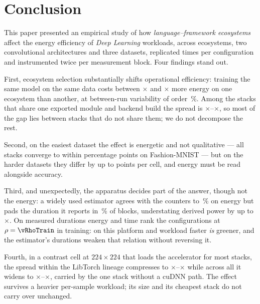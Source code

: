 \section{Conclusion}
\label{sec:conclusion}

This paper presented an empirical study of how \emph{language--framework
ecosystems} affect the energy efficiency of \emph{Deep Learning} workloads,
across \vEcosystems{} ecosystems, two convolutional architectures and three
datasets, replicated \vRepetitions{} times per configuration and instrumented
twice per measurement block. Four findings stand out.

First, ecosystem selection substantially shifts operational efficiency:
training the same model on the same data costs between \vSpreadTrainMin$\times$
and \vSpreadTrainMax$\times$ more energy on one ecosystem than another, at
between-run variability of order \vCVTrainMedian\,\%. Among the \vCtrlStacks{}
stacks that share one exported module and backend build the spread is
\vCtrlSpreadMin$\times$--\vCtrlSpreadMax$\times$, so most of the gap lies
between stacks that do not share them; we do not decompose the rest.

Second, on the easiest dataset the effect is energetic and not qualitative ---
all \vEcosystems{} stacks converge to within \vAccBlockSpreadFashionMax{}
percentage points on Fashion-MNIST --- but on the harder datasets they differ by
up to \vAccBlockSpreadTrainedMax{} points per cell, and energy must be read
alongside accuracy.

Third, and unexpectedly, the apparatus decides part of the answer, though not
the energy: a widely used estimator agrees with the counters to
\vCCmeasDisagreementPct\,\% on energy but pads the duration it reports in
\vWindowPaddedPct\,\% of blocks, understating derived power by up to
\vPowerUnderstatedWorst$\times$. On measured durations energy and time rank the
configurations at $\rho = \vRhoTrain$ in training: on this platform and
workload faster \emph{is} greener, and the estimator's durations weaken that
relation without reversing it.

Fourth, in a contrast cell at $224\times224$ that loads the accelerator for most
stacks, the spread within the LibTorch lineage compresses to
\vSatLibtorchSpreadTrainVgg$\times$--\vSatLibtorchSpreadTrainResnet$\times$
while across all \vSatEcosystems{} it widens to
\vSatSpreadTrainResnet$\times$--\vSatSpreadTrainVgg$\times$, carried by the one
stack without a cuDNN path. The effect survives a heavier per-sample workload;
its size and its cheapest stack do not carry over unchanged.

